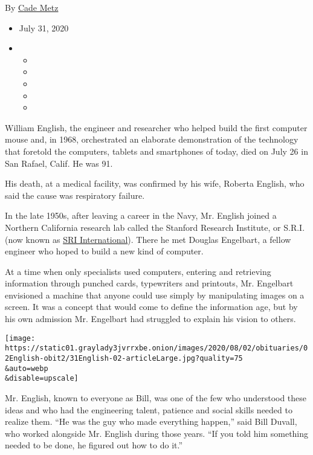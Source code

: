 By \href{https://www.nytimes3xbfgragh.onion/by/cade-metz}{Cade Metz}

\begin{itemize}
\item
  July 31, 2020
\item
  \begin{itemize}
  \item
  \item
  \item
  \item
  \item
  \end{itemize}
\end{itemize}

William English, the engineer and researcher who helped build the first
computer mouse and, in 1968, orchestrated an elaborate demonstration of
the technology that foretold the computers, tablets and smartphones of
today, died on July 26 in San Rafael, Calif. He was 91.

His death, at a medical facility, was confirmed by his wife, Roberta
English, who said the cause was respiratory failure.

In the late 1950s, after leaving a career in the Navy, Mr. English
joined a Northern California research lab called the Stanford Research
Institute, or S.R.I. (now known as \href{https://www.sri.com/}{SRI
International}). There he met Douglas Engelbart, a fellow engineer who
hoped to build a new kind of computer.

At a time when only specialists used computers, entering and retrieving
information through punched cards, typewriters and printouts, Mr.
Engelbart envisioned a machine that anyone could use simply by
manipulating images on a screen. It was a concept that would come to
define the information age, but by his own admission Mr. Engelbart had
struggled to explain his vision to others.

\texttt{[image: https://static01.graylady3jvrrxbe.onion/images/2020/08/02/obituaries/02English-obit2/31English-02-articleLarge.jpg?quality=75\\\&auto=webp\\\&disable=upscale]}

Mr. English, known to everyone as Bill, was one of the few who
understood these ideas and who had the engineering talent, patience and
social skills needed to realize them. ``He was the guy who made
everything happen,'' said Bill Duvall, who worked alongside Mr. English
during those years. ``If you told him something needed to be done, he
figured out how to do it.''

